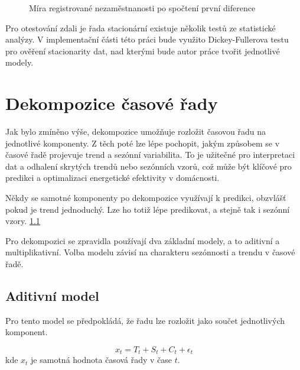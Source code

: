 \documentclass[FM,BP,fonts]{tulthesis}
\begin{document}
\begin{figure}[htbp]
	\centering
	\caption{Míra registrované nezaměstnanosti po spočtení první diference }
	\label{fig:nezamestnanost_diff}
\end{figure}

Pro otestování zdali je řada stacionární existuje několik testů ze statistické analýzy. V implementační části této práci bude využito Dickey-Fullerova testu pro ověření stacionarity dat, nad kterými bude autor práce tvořit jednotlivé modely. 


\section{Dekompozice časové řady}
Jak bylo zmíněno výše, dekompozice umožňuje rozložit časovou řadu na jednotlivé komponenty. Z těch poté lze lépe pochopit, jakým způsobem se v časové řadě projevuje trend a sezónní variabilita. To je užitečné pro interpretaci dat a odhalení skrytých trendů nebo sezónních vzorů, což může být klíčové pro predikci a optimalizaci energetické efektivity v domácnosti.

Někdy se samotné komponenty po dekompozice využívají k predikci, obzvlášť pokud je trend jednoduchý. Lze ho totiž lépe predikovat, a stejně tak i sezónní vzory. \ref{}

Pro dekompozici se zpravidla používají dva základní modely, a to aditivní a multiplikativní. Volba modelu závisí na charakteru sezónnosti a trendu v časové řadě.

\subsection{Aditivní model}
Pro tento model se předpokládá, že řadu lze rozložit jako součet jednotlivých komponent.

\begin{equation}
	x_t = T_t + S_t + C_t + \epsilon_t
\end{equation}
kde $x_t$ je samotná hodnota časová řady v čase $t$.
\end{document}
